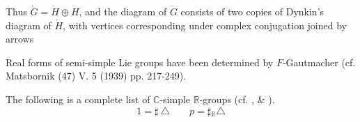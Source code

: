 Thus $\dot{G}= \dot{H} \oplus \dot{H}$, and the diagram of $\dot{G}$
consists of two copies of Dynkin's diagram of $\dot{H}$, with vertices
corresponding under complex conjugation joined by arrows

\begin{figure}[H]
\end{figure}

Real forms of semi-simple Lie groups have been determined by
$F$-Gautmacher (cf. Matsbornik (47) V. 5 (1939) pp. 217-249).

The following is a complete list of $\mathbb{C}$-simple
$\mathbb{R}$-groups (cf. \cite{1}, \cite{20} \& \cite{24}).
$$
1= \sharp ~\triangle \qquad p = \sharp {}_{\mathbb{R}}\triangle
$$


